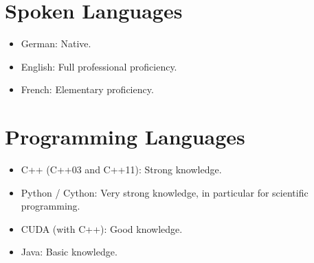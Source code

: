 \documentclass[a4paper,11pt]{article}
\begin{document}
\section{Spoken Languages}
\begin{itemize}
    \item German: Native.
    \item English: Full professional proficiency.
    \item French: Elementary proficiency.
\end{itemize}

\section{Programming Languages}
\begin{itemize}
    \item C++ (C++03 and C++11): Strong knowledge.
    \item Python / Cython: Very strong knowledge, in particular for scientific programming.
    \item CUDA (with C++): Good knowledge.
    \item Java: Basic knowledge.
\end{itemize}

\begin{publications}
\end{publications}
\end{document}
